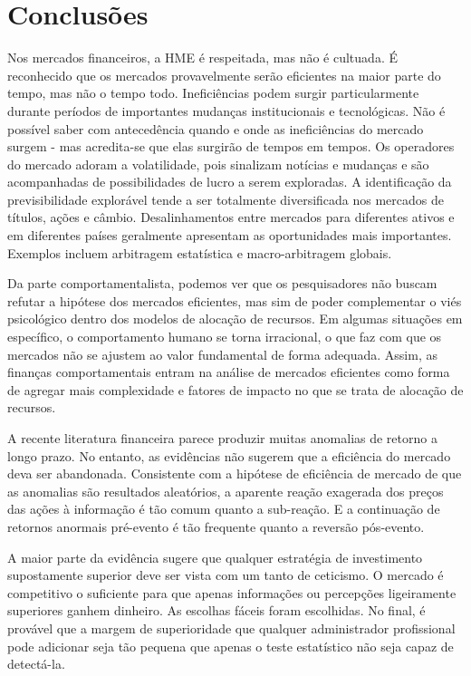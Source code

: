 \chapter*{Conclusões}\label{cap:conclusao}

Nos mercados financeiros, a HME é respeitada, mas não é cultuada. É reconhecido que os mercados provavelmente serão eficientes na maior parte do tempo, mas não o tempo todo. Ineficiências podem surgir particularmente durante períodos de importantes mudanças institucionais e tecnológicas. Não é possível saber com antecedência quando e onde as ineficiências do mercado surgem - mas acredita-se que elas surgirão de tempos em tempos. Os operadores do mercado adoram a volatilidade, pois sinalizam notícias e mudanças e são acompanhadas de possibilidades de lucro a serem exploradas. A identificação da previsibilidade explorável tende a ser totalmente diversificada nos mercados de títulos, ações e câmbio. Desalinhamentos entre mercados para diferentes ativos e em diferentes países geralmente apresentam as oportunidades mais importantes. Exemplos incluem arbitragem estatística e macro-arbitragem globais.

Da parte comportamentalista, podemos ver que os pesquisadores não buscam refutar a hipótese dos mercados eficientes, mas sim de poder complementar o viés psicológico dentro dos modelos de alocação de recursos. Em algumas situações em específico, o comportamento humano se torna irracional, o que faz com que os mercados não se ajustem ao valor fundamental de forma adequada. Assim, as finanças comportamentais entram na análise de mercados eficientes como forma de agregar mais complexidade e fatores de impacto no que se trata de alocação de recursos.

A recente literatura financeira parece produzir muitas anomalias de retorno a longo prazo. No entanto, as evidências não sugerem que a eficiência do mercado deva ser abandonada. Consistente com a hipótese de eficiência de mercado de que as anomalias são resultados aleatórios, a aparente reação exagerada dos preços das ações à informação é tão comum quanto a sub-reação. E a continuação de retornos anormais pré-evento é tão frequente quanto a reversão pós-evento.

A maior parte da evidência sugere que qualquer estratégia de investimento supostamente superior deve ser vista com um tanto de ceticismo. O mercado é competitivo o suficiente para que apenas informações ou percepções ligeiramente superiores ganhem dinheiro. As escolhas fáceis foram escolhidas. No final, é provável que a margem de superioridade que qualquer administrador profissional pode adicionar seja tão pequena que apenas o teste estatístico não seja capaz de detectá-la.
